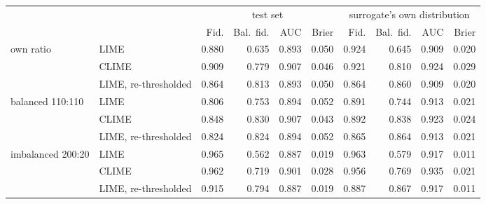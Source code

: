 \begin{tabular}{@{}llrrrrrrrr@{}}
  \toprule
   &  & \multicolumn{4}{c}{test set} & \multicolumn{4}{c}{surrogate's own distribution} \\
  \cmidrule(lr){3-6} \cmidrule(lr){7-10}
   &  & Fid. & Bal.\ fid. & AUC & Brier & Fid. & Bal.\ fid. & AUC & Brier \\
  \midrule
  own ratio & LIME & 0.880 & 0.635 & 0.893 & 0.050 & 0.924 & 0.645 & 0.909 & 0.020 \\
   & CLIME & 0.909 & 0.779 & 0.907 & 0.046 & 0.921 & 0.810 & 0.924 & 0.029 \\
   & LIME, re-thresholded & 0.864 & 0.813 & 0.893 & 0.050 & 0.864 & 0.860 & 0.909 & 0.020 \\
  \midrule
  balanced 110:110 & LIME & 0.806 & 0.753 & 0.894 & 0.052 & 0.891 & 0.744 & 0.913 & 0.021 \\
   & CLIME & 0.848 & 0.830 & 0.907 & 0.043 & 0.892 & 0.838 & 0.923 & 0.024 \\
   & LIME, re-thresholded & 0.824 & 0.824 & 0.894 & 0.052 & 0.865 & 0.864 & 0.913 & 0.021 \\
  \midrule
  imbalanced 200:20 & LIME & 0.965 & 0.562 & 0.887 & 0.019 & 0.963 & 0.579 & 0.917 & 0.011 \\
   & CLIME & 0.962 & 0.719 & 0.901 & 0.028 & 0.956 & 0.769 & 0.935 & 0.021 \\
   & LIME, re-thresholded & 0.915 & 0.794 & 0.887 & 0.019 & 0.887 & 0.867 & 0.917 & 0.011 \\
  \bottomrule
\end{tabular}
